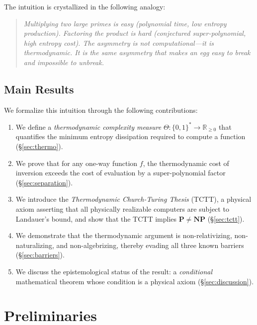 \documentclass[12pt, a4paper]{article}
\newcommand{\Pc}{\mathbf{P}}
\newcommand{\NPc}{\mathbf{NP}}
\newcommand{\R}{\mathbb{R}}
\theoremstyle{plain}
\theoremstyle{definition}
\theoremstyle{remark}
\begin{document}
The intuition is crystallized in the following analogy:
\begin{quote}
  \emph{Multiplying two large primes is easy (polynomial time, low entropy
  production). Factoring the product is hard (conjectured super-polynomial,
  high entropy cost). The asymmetry is not computational---it is
  thermodynamic. It is the same asymmetry that makes an egg easy to break
  and impossible to unbreak.}
\end{quote}

\subsection{Main Results}

We formalize this intuition through the following contributions:

\begin{enumerate}
  \item We define a \emph{thermodynamic complexity measure}
    $\Theta: \{0,1\}^* \to \R_{\geq 0}$ that quantifies the minimum
    entropy dissipation required to compute a function (\S\ref{sec:thermo}).

  \item We prove that for any one-way function $f$, the thermodynamic
    cost of inversion exceeds the cost of evaluation by a super-polynomial
    factor (\S\ref{sec:separation}).

  \item We introduce the \emph{Thermodynamic Church-Turing Thesis} (TCTT),
    a physical axiom asserting that all physically realizable computers
    are subject to Landauer's bound, and show that the TCTT implies
    $\Pc \neq \NPc$ (\S\ref{sec:tctt}).

  \item We demonstrate that the thermodynamic argument is non-relativizing,
    non-naturalizing, and non-algebrizing, thereby evading all three known
    barriers (\S\ref{sec:barriers}).

  \item We discuss the epistemological status of the result: a
    \emph{conditional} mathematical theorem whose condition is a physical
    axiom (\S\ref{sec:discussion}).
\end{enumerate}

\section{Preliminaries}\label{sec:prelim}
\end{document}
